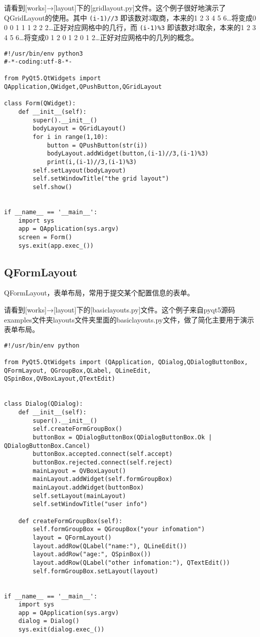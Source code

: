 \documentclass[11pt,oneside]{article}
\begin{document}
请看到[works]→[layout]下的[gridlayout.py]文件。这个例子很好地演示了QGridLayout的使用。其中 \texttt{(i-1)//3} 即该数对3取商，本来的1 2 3 4 5 6\ldots{}将变成0 0 0 1 1 1 2 2 2\ldots{}正好对应网格中的几行，而 \texttt{(i-1)\%3} 即该数对3取余，本来的1 2 3 4 5 6\ldots{}将变成0 1 2 0 1 2 0 1 2\ldots{}正好对应网格中的几列的概念。

\begin{verbatim}
#!/usr/bin/env python3
#-*-coding:utf-8-*-

from PyQt5.QtWidgets import QApplication,QWidget,QPushButton,QGridLayout

class Form(QWidget):
    def __init__(self):
        super().__init__()
        bodyLayout = QGridLayout()
        for i in range(1,10):
            button = QPushButton(str(i))
            bodyLayout.addWidget(button,(i-1)//3,(i-1)%3)
            print(i,(i-1)//3,(i-1)%3)
        self.setLayout(bodyLayout)
        self.setWindowTitle("the grid layout")
        self.show()


if __name__ == '__main__':
    import sys
    app = QApplication(sys.argv)
    screen = Form()
    sys.exit(app.exec_())
\end{verbatim}



\subsection{QFormLayout}
\label{sec:orgheadline36}
QFormLayout，表单布局，常用于提交某个配置信息的表单。

请看到[works]→[layout]下的[basiclayouts.py]文件。这个例子来自pyqt5源码examples文件夹layouts文件夹里面的basiclayouts.py文件，做了简化主要用于演示表单布局。

\begin{verbatim}
#!/usr/bin/env python

from PyQt5.QtWidgets import (QApplication, QDialog,QDialogButtonBox, QFormLayout, QGroupBox,QLabel, QLineEdit, QSpinBox,QVBoxLayout,QTextEdit)


class Dialog(QDialog):
    def __init__(self):
        super().__init__()
        self.createFormGroupBox()
        buttonBox = QDialogButtonBox(QDialogButtonBox.Ok | QDialogButtonBox.Cancel)
        buttonBox.accepted.connect(self.accept)
        buttonBox.rejected.connect(self.reject)
        mainLayout = QVBoxLayout()
        mainLayout.addWidget(self.formGroupBox)
        mainLayout.addWidget(buttonBox)
        self.setLayout(mainLayout)
        self.setWindowTitle("user info")

    def createFormGroupBox(self):
        self.formGroupBox = QGroupBox("your infomation")
        layout = QFormLayout()
        layout.addRow(QLabel("name:"), QLineEdit())
        layout.addRow("age:", QSpinBox())
        layout.addRow(QLabel("other infomation:"), QTextEdit())
        self.formGroupBox.setLayout(layout)


if __name__ == '__main__':
    import sys
    app = QApplication(sys.argv)
    dialog = Dialog()
    sys.exit(dialog.exec_())
\end{verbatim}
\end{document}
